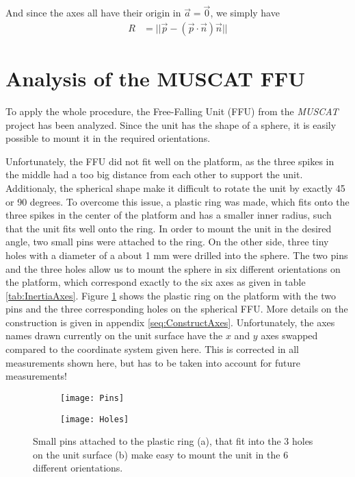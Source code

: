 \documentclass[journal]{IEEEtran}
\begin{document}
And since the axes all have their origin in $\vec{a} = \vec{0}$, we simply have
\begin{align}
	R & = || \vec{p} - (\vec{p} \cdot \vec{n}) \vec{n} ||
\end{align}

\section{Analysis of the MUSCAT FFU}

To apply the whole procedure, the Free-Falling Unit (FFU) from the \emph{MUSCAT} project has been analyzed.
Since the unit has the shape of a sphere, it is easily possible to mount it in the required orientations. 

Unfortunately, the FFU did not fit well on the platform, as the three spikes in the middle had a too big distance from each other to support the unit.
Additionaly, the spherical shape make it difficult to rotate the unit by exactly 45 or 90 degrees.
To overcome this issue, a plastic ring was made, which fits onto the three spikes in the center of the platform and has a smaller inner radius, such that the unit fits well onto the ring.
In order to mount the unit in the desired angle, two small pins were attached to the ring. On the other side, three tiny holes with a diameter of a about 1 mm were drilled into the sphere. The two pins and the three holes allow us to mount the sphere in six different orientations on the platform, which correspond exactly to the six axes as given in table \ref{tab:InertiaAxes}.
Figure \ref{fig:PinsHoles} shows the plastic ring on the platform with the two pins and the three corresponding holes on the spherical FFU.
More details on the construction is given in appendix \ref{seq:ConstructAxes}.
Unfortunately, the axes names drawn currently on the unit surface have the $x$ and $y$ axes swapped compared to the coordinate system given here. This is corrected in all measurements shown here, but has to be taken into account for future measurements!

\begin{figure}
	\centering

	\begin{subfigure}{0.49\linewidth}
		\texttt{[image: Pins]}
		\subcaption{}
	\end{subfigure}
	\begin{subfigure}{0.49\linewidth}
		\texttt{[image: Holes]}
		\subcaption{}
	\end{subfigure}

	\caption{Small pins attached to the plastic ring (a), that fit into the 3 holes on the unit surface (b) make easy to mount the unit in the 6 different orientations.}
	\label{fig:PinsHoles}
\end{figure}
\end{document}
